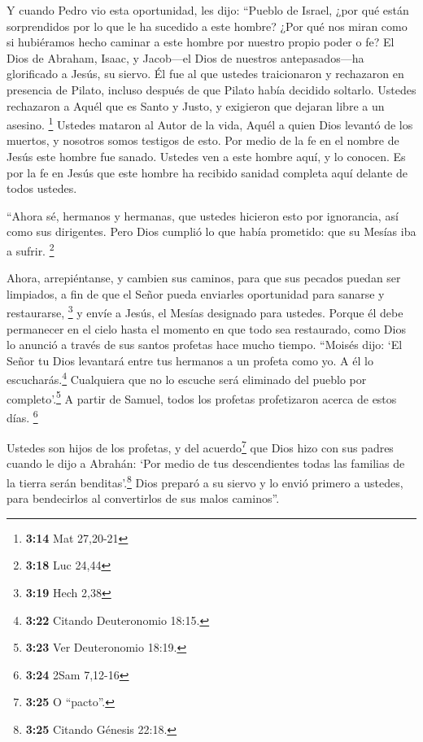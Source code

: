  Y cuando Pedro vio esta oportunidad, les dijo: ``Pueblo
de Israel, ¿por qué están sorprendidos por lo que le ha sucedido a este
hombre? ¿Por qué nos miran como si hubiéramos hecho caminar a este
hombre por nuestro propio poder o fe?  El Dios de
Abraham, Isaac, y Jacob---el Dios de nuestros antepasados---ha
glorificado a Jesús, su siervo. Él fue al que ustedes traicionaron y
rechazaron en presencia de Pilato, incluso después de que Pilato había
decidido soltarlo.  Ustedes rechazaron a Aquél que es
Santo y Justo, y exigieron que dejaran libre a un asesino. \footnote{\textbf{3:14}
  Mat 27,20-21}  Ustedes mataron al Autor de la vida,
Aquél a quien Dios levantó de los muertos, y nosotros somos testigos de
esto.  Por medio de la fe en el nombre de Jesús este
hombre fue sanado. Ustedes ven a este hombre aquí, y lo conocen. Es por
la fe en Jesús que este hombre ha recibido sanidad completa aquí delante
de todos ustedes.

 ``Ahora sé, hermanos y hermanas, que ustedes hicieron
esto por ignorancia, así como sus dirigentes.  Pero Dios
cumplió lo que había prometido: que su Mesías iba a sufrir. \footnote{\textbf{3:18}
  Luc 24,44}

 Ahora, arrepiéntanse, y cambien sus caminos, para que
sus pecados puedan ser limpiados, a fin de que el Señor pueda enviarles
oportunidad para sanarse y restaurarse, \footnote{\textbf{3:19} Hech
  2,38}  y envíe a Jesús, el Mesías designado para
ustedes.  Porque él debe permanecer en el cielo hasta el
momento en que todo sea restaurado, como Dios lo anunció a través de sus
santos profetas hace mucho tiempo.  ``Moisés dijo: `El
Señor tu Dios levantará entre tus hermanos a un profeta como yo. A él lo
escucharás.\footnote{\textbf{3:22} Citando Deuteronomio 18:15.}
 Cualquiera que no lo escuche será eliminado del pueblo
por completo'.\footnote{\textbf{3:23} Ver Deuteronomio 18:19.}
 A partir de Samuel, todos los profetas profetizaron
acerca de estos días. \footnote{\textbf{3:24} 2Sam 7,12-16}

 Ustedes son hijos de los profetas, y del
acuerdo\footnote{\textbf{3:25} O ``pacto''.} que Dios hizo con sus
padres cuando le dijo a Abrahán: `Por medio de tus descendientes todas
las familias de la tierra serán benditas'.\footnote{\textbf{3:25}
  Citando Génesis 22:18.}  Dios preparó a su siervo y lo
envió primero a ustedes, para bendecirlos al convertirlos de sus malos
caminos''.

